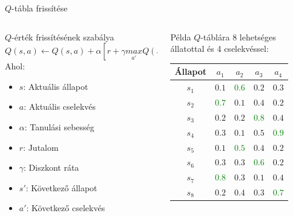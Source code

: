 \documentclass[english, aspectratio=169]{beamer}
\begin{document}
\begin{frame}{$Q$-tábla frissítése}
\begin{columns}
\begin{column}{.65\textwidth}
\begin{block}{$Q$-érték frissítésének szabálya}
\[
Q\left( s,a \right) \leftarrow Q\left( s,a \right) + \alpha \left[ r + \gamma \underset{a'}{max}Q\left( s',a' \right) - Q\left( s,a \right) \right]
\]
Ahol:
\begin{itemize}
	\item $s$: Aktuális állapot
	\item $a$: Aktuális cselekvés
	\item $\alpha$: Tanulási sebesség
	\item $r$: Jutalom 
	\item $\gamma$: Diszkont ráta
	\item $s'$: Következő állapot
	\item $a'$: Következő cselekvés
\end{itemize}
\end{block}
\end{column}
\begin{column}{.35\textwidth}
\begin{footnotesize}
\begin{table}[h]
\centering
Példa $Q$-táblára 8 lehetséges állatottal és 4 cselekvéssel:\par\medskip
\begin{tabular}{|c||c|c|c|c|}\hline
Állapot & $a_1$ & $a_2$ & $a_3$ & $a_4$ \\\hline
$ s_1 $ & $0.1$ & \textcolor{green}{$0.6$} & $0.2$ & $0.3$ \\\hline
$ s_2 $ & \textcolor{green}{$0.7$} & $0.1$ & $0.4$ & $0.2$ \\\hline
$ s_3 $ & $0.2$ & $0.2$ & \textcolor{green}{$0.8$} & $0.4$ \\\hline
$ s_4 $ & $0.3$ & $0.1$ & $0.5$ & \textcolor{green}{$0.9$} \\\hline
$ s_5 $ & $0.1$ & \textcolor{green}{$0.5$} & $0.4$ & $0.2$ \\\hline
$ s_6 $ & $0.3$ & $0.3$ & \textcolor{green}{$0.6$} & $0.2$ \\\hline
$ s_7 $ & \textcolor{green}{$0.8$} & $0.3$ & $0.1$ & $0.4$ \\\hline
$ s_8 $ & $0.2$ & $0.4$ & $0.3$ & \textcolor{green}{$0.7$} \\\hline
\end{tabular}
\end{table}
\end{footnotesize}
\end{column}
\end{columns}
\end{frame}
\end{document}
